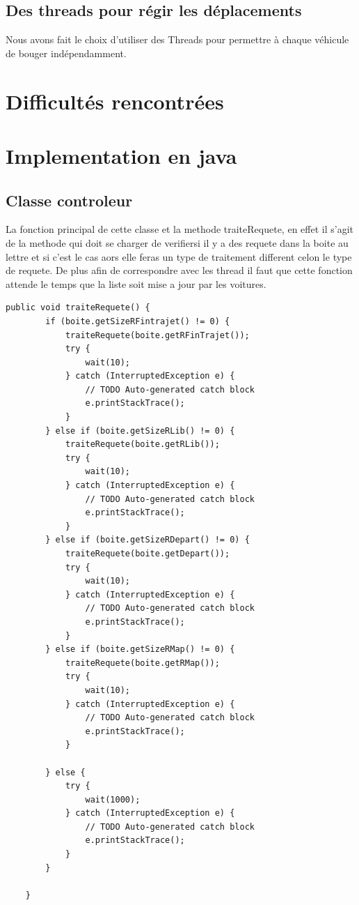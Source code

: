 \documentclass[a4paper, titlepage]{report}
\begin{document}
\section{Des threads pour régir les déplacements}

Nous avons fait le choix d'utiliser des Threads pour permettre à chaque véhicule de bouger indépendamment.

\chapter{Difficultés rencontrées}

\chapter{Implementation en java}
\section{Classe controleur}
La fonction principal de cette classe et la methode traiteRequete, en effet il s'agit de la methode qui doit se charger de verifiersi il y a des requete dans la boite au lettre et si c'est le cas aors elle feras un type de traitement different celon le type de requete. De plus afin de correspondre avec les thread il faut que cette fonction attende le temps	que la liste soit mise a jour par les voitures.\\

\begin{lstlisting}
public void traiteRequete() {
		if (boite.getSizeRFintrajet() != 0) {
			traiteRequete(boite.getRFinTrajet());
			try {
				wait(10);
			} catch (InterruptedException e) {
				// TODO Auto-generated catch block
				e.printStackTrace();
			}
		} else if (boite.getSizeRLib() != 0) {
			traiteRequete(boite.getRLib());
			try {
				wait(10);
			} catch (InterruptedException e) {
				// TODO Auto-generated catch block
				e.printStackTrace();
			}
		} else if (boite.getSizeRDepart() != 0) {
			traiteRequete(boite.getDepart());
			try {
				wait(10);
			} catch (InterruptedException e) {
				// TODO Auto-generated catch block
				e.printStackTrace();
			}
		} else if (boite.getSizeRMap() != 0) {
			traiteRequete(boite.getRMap());
			try {
				wait(10);
			} catch (InterruptedException e) {
				// TODO Auto-generated catch block
				e.printStackTrace();
			}

		} else {
			try {
				wait(1000);
			} catch (InterruptedException e) {
				// TODO Auto-generated catch block
				e.printStackTrace();
			}
		}

	}
\end{lstlisting}
\end{document}
